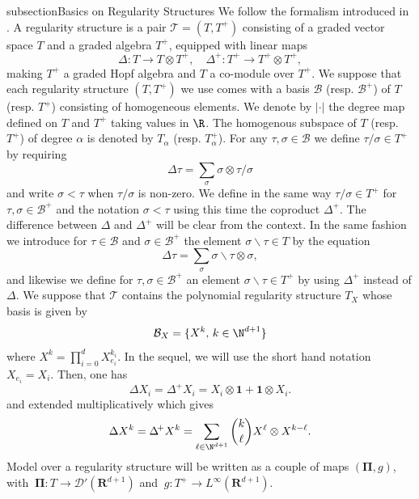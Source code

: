 \documentclass[11pt]{preprint}
\def\CB{\mathcal{B}}
\newcommand{\mcB}{\mathcal{B}}
\newcommand{\mcD}{\mathcal{D}}
\def\PPi{\boldsymbol{\Pi}}
\def\one{\mathbf{1}}
\newcommand{\bfR}{\mathbf{R}}
\newcommand{\scrT}{\mathscr{T}}
\begin{document}
subsection{Basics on Regularity Structures  }\label{subsection_basicsRS}
We follow the formalism introduced in \cite{BH26}.	A regularity structure is a pair $\scrT=(T,T^+)$ consisting of a graded vector space $T$ and a graded algebra $T^+$, equipped with linear maps 
	\begin{equation*}
		\Delta : T \rightarrow T \otimes T^+,
		\quad
		\Delta^{\!+}  : T^+ \rightarrow T^+\otimes T^+,
	\end{equation*}
	making $T^+$ a graded Hopf algebra and $T$ a co-module over $T^+$. We suppose that each regularity structure $(T,T^+)$ we use comes with a basis $\mcB$ (resp. $ \mcB^+ $) of $T$ (resp. $T^+$) consisting of homogeneous elements. We denote by $\vert \cdot \vert$ the degree map defined on $T$ and $T^+$ taking values in $\R$. The homogenous subspace of $T$ (resp. $T^+$) of degree $\alpha$ is denoted by $T_{\alpha}$ (resp. $T_{\alpha}^+$). For any $\tau,\sigma\in\mcB$ we define $\tau/\sigma\in T^+$ by requiring
	$$\Delta \tau = \sum_{\sigma} \sigma \otimes  \tau/\sigma$$
	and write $\sigma<\tau$ when $\tau/\sigma$ is non-zero. We define in the same way $\tau/\sigma\in T^+$ for $\tau,\sigma\in \mcB^+$ and the notation $\sigma<\tau$ using this time the coproduct $\Delta^{\!+}$. The difference between $\Delta$ and $ \Delta^{\!+} $ will be clear from the context. In the same fashion we introduce for $\tau\in \mcB$ and $\sigma\in\mcB^+$ the element $\sigma \backslash \tau\in T$ by the equation
	\begin{equation}\label{eq_sigmabackslashtau}\Delta \tau = \sum_{\sigma} \sigma\backslash \tau \otimes \sigma,
	\end{equation}
	and likewise we define for $\tau,\sigma\in\mcB^+$ an element $\sigma\backslash \tau\in T^+$ by using $\Delta^{\!+}$ instead of $\Delta$. 
	We suppose that $\mathscr{T}$ contains the polynomial regularity structure $T_X$ whose basis is given by 
		 $$ \CB_X = \{  X^k, \, k \in \N^{d+1} \}$$
	where $ X^{k} = \prod_{i=0}^d X_{e_i}^{k_i} $. In the sequel, we will use the short hand notation $ X_{e_i} = X_i $.
	Then, one has
	\begin{equation*}
		\Delta X_i = \Delta^{\!+} X_i = X_i \otimes \one + \one \otimes X_i.
		\end{equation*}
		and extended multiplicatively which gives
		\begin{equation*}
			\Delta X^{k} = \Delta^{\!+} X^{k} = 
			\sum_{\ell \in \N^{d+1}} \binom{k}{\ell}  X^{\ell} \otimes X^{k-\ell}.
		\end{equation*}
	Model over a regularity structure will be written as a couple of maps ${ (\PPi,g)}$, with ${\ \PPi}:T\rightarrow \mcD'(\bfR^{d+1})$ and ${\ g}:T^+\rightarrow L^\infty(\bfR^{d+1})$. \label{model}
\end{document}
